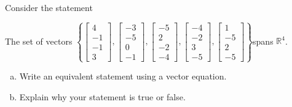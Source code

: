 
\begin{exerciseStatement}


Consider the statement 
\begin{center}\begin{minipage}{0.8\textwidth}
 The set of vectors \( \left\{ \left[\begin{array}{c}
4 \\
-1 \\
-1 \\
3
\end{array}\right] , \left[\begin{array}{c}
-3 \\
-5 \\
0 \\
-1
\end{array}\right] , \left[\begin{array}{c}
-5 \\
2 \\
-2 \\
-4
\end{array}\right] , \left[\begin{array}{c}
-4 \\
-2 \\
3 \\
-5
\end{array}\right] , \left[\begin{array}{c}
1 \\
-5 \\
2 \\
-5
\end{array}\right] \right\} \)spans \(\mathbb{R}^4\). 
\end{minipage}\end{center}
    


\begin{enumerate}[(a)]
\item  Write an equivalent statement using a vector equation.
\item  Explain why your statement is true or false.
\end{enumerate}
    
\end{exerciseStatement}
    
